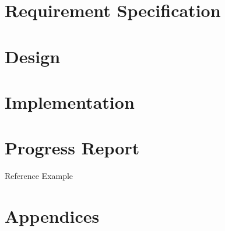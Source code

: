 \documentclass[paper=a4, fontsize=11pt,twoside]{scrartcl}		%
\begin{document}
\section{Requirement Specification}
\clearpage

\section{Design}
\clearpage

\section{Implementation}
\clearpage

\section{Progress Report}
Reference Example\cite{Debray:2000:CTC:349214.349233}
\clearpage



\section{Appendices}
\clearpage


\end{document}
